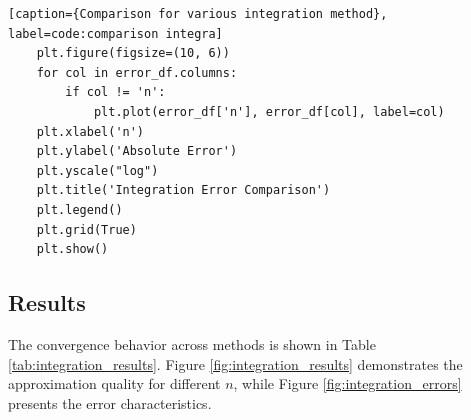 \documentclass[10pt]{article}
\begin{document}
\begin{lstlisting}[style=custompython][caption={Comparison for various integration method}, label=code:comparison integra]
    plt.figure(figsize=(10, 6))
    for col in error_df.columns:
        if col != 'n':
            plt.plot(error_df['n'], error_df[col], label=col)
    plt.xlabel('n')
    plt.ylabel('Absolute Error')
    plt.yscale("log")
    plt.title('Integration Error Comparison')
    plt.legend()
    plt.grid(True)
    plt.show()

\end{lstlisting}

\subsection{Results}

The convergence behavior across methods is shown in Table \ref{tab:integration_results}. Figure \ref{fig:integration_results} demonstrates the approximation quality for different \(n\), while Figure \ref{fig:integration_errors} presents the error characteristics.
\end{document}
